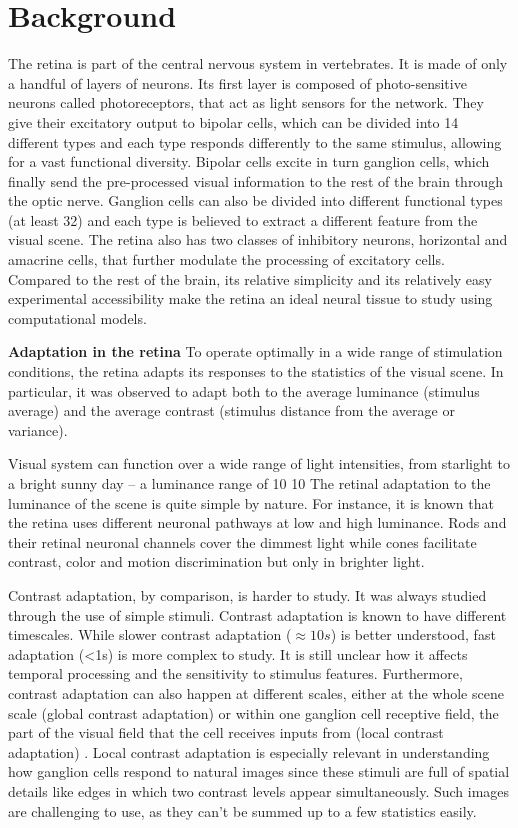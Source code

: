 \section{Background}\label{sec:background}

The retina is part of the central nervous system in vertebrates. It is
made of only a handful of layers of neurons. Its first layer is composed of
photo-sensitive neurons called photoreceptors, that act as light sensors for
the network. They give their excitatory output to bipolar cells, which can be
divided into 14 different types and each type responds differently to the same
stimulus, allowing for a vast functional diversity. Bipolar cells excite in
turn ganglion cells, which finally send the pre-processed visual information to
the rest of the brain through the optic nerve. Ganglion cells can also be
divided into different functional types (at least 32) and each type is believed
to extract a different feature from the visual scene. The retina also has two
classes of inhibitory neurons, horizontal and amacrine cells, that further
modulate the processing of excitatory cells. Compared to the rest of the brain,
its relative simplicity and its relatively easy experimental accessibility make
the retina an ideal neural tissue to study using computational models.

\textbf{Adaptation in the retina}
To operate optimally in a wide range of
stimulation conditions, the retina adapts its responses to the statistics of
the visual scene.
In particular, it was observed to adapt both to the average
luminance (stimulus average) and the average contrast (stimulus distance
from the average or variance).

Visual system can function over a wide range of light intensities, from
starlight to a bright sunny day – a luminance range of 10 10
The retinal adaptation to the luminance of the scene is quite simple by nature.
For instance, it is known that the retina uses different neuronal
pathways at low and high luminance. Rods and their retinal neuronal channels
cover the dimmest light while cones facilitate contrast, color and motion
discrimination but only in brighter light.

Contrast adaptation, by comparison, is harder to study. It was always studied
through the use of simple stimuli.
Contrast adaptation is known to have different timescales.
While slower contrast adaptation ($\approx10s$) is better understood, fast
adaptation (<1s) is more complex to study. It is still unclear how it
affects temporal processing and the sensitivity to stimulus
features\citep{baccus_fast_2002}. Furthermore, contrast adaptation can also
happen at different scales, either at the whole scene scale (global contrast
adaptation) or within one ganglion cell receptive field, the part of the visual
field that the cell receives inputs from (local contrast adaptation)
\citep{garvert_local_2013}. Local contrast adaptation is especially relevant in
understanding how ganglion cells respond to natural images since these stimuli
are full of spatial details like edges in which two contrast levels appear
simultaneously. Such images are challenging to use, as they can't be summed up
to a few statistics easily.